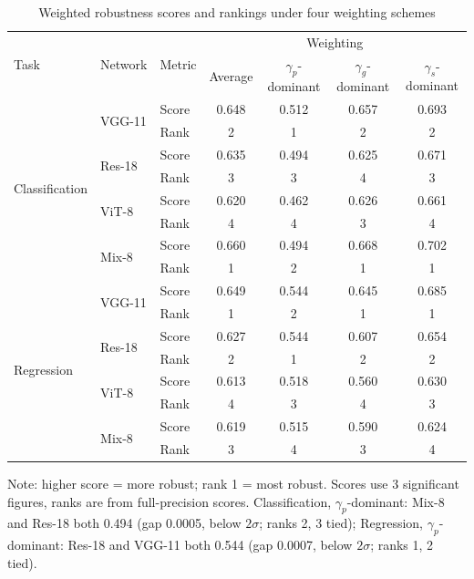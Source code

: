 \begin{table}[htbp]
  \centering
  \caption{Weighted robustness scores and rankings under four weighting schemes}
  \label{tab:score}
  \begin{tabular}{@{}lllcccc@{}}
    \toprule
    \multirow{2}{*}{Task} & \multirow{2}{*}{Network} & \multirow{2}{*}{Metric} & \multicolumn{4}{c}{Weighting} \\
    \cmidrule(l){4-7}
    & & & Average & $\gamma_p$-dominant & $\gamma_g$-dominant & $\gamma_s$-dominant \\
    \midrule
    \multirow{8}{*}{Classification} & \multirow{2}{*}{VGG-11} & Score & 0.648 & 0.512 & 0.657 & 0.693 \\
    & & Rank & 2 & 1 & 2 & 2 \\
    \addlinespace[2pt]
     & \multirow{2}{*}{Res-18} & Score & 0.635 & 0.494 & 0.625 & 0.671 \\
    & & Rank & 3 & 3 & 4 & 3 \\
    \addlinespace[2pt]
     & \multirow{2}{*}{ViT-8} & Score & 0.620 & 0.462 & 0.626 & 0.661 \\
    & & Rank & 4 & 4 & 3 & 4 \\
    \addlinespace[2pt]
     & \multirow{2}{*}{Mix-8} & Score & 0.660 & 0.494 & 0.668 & 0.702 \\
    & & Rank & 1 & 2 & 1 & 1 \\
    \midrule
    \multirow{8}{*}{Regression} & \multirow{2}{*}{VGG-11} & Score & 0.649 & 0.544 & 0.645 & 0.685 \\
    & & Rank & 1 & 2 & 1 & 1 \\
    \addlinespace[2pt]
     & \multirow{2}{*}{Res-18} & Score & 0.627 & 0.544 & 0.607 & 0.654 \\
    & & Rank & 2 & 1 & 2 & 2 \\
    \addlinespace[2pt]
     & \multirow{2}{*}{ViT-8} & Score & 0.613 & 0.518 & 0.560 & 0.630 \\
    & & Rank & 4 & 3 & 4 & 3 \\
    \addlinespace[2pt]
     & \multirow{2}{*}{Mix-8} & Score & 0.619 & 0.515 & 0.590 & 0.624 \\
    & & Rank & 3 & 4 & 3 & 4 \\
    \bottomrule
  \end{tabular}
  \par\smallskip
  \begin{minipage}{\linewidth}
    \footnotesize Note: higher score = more robust; rank 1 = most robust. Scores use 3 significant figures, ranks are from full-precision scores. Classification, $\gamma_p$-dominant: Mix-8 and Res-18 both 0.494 (gap 0.0005, below $2\sigma$; ranks 2, 3 tied); Regression, $\gamma_p$-dominant: Res-18 and VGG-11 both 0.544 (gap 0.0007, below $2\sigma$; ranks 1, 2 tied).
  \end{minipage}
\end{table}
